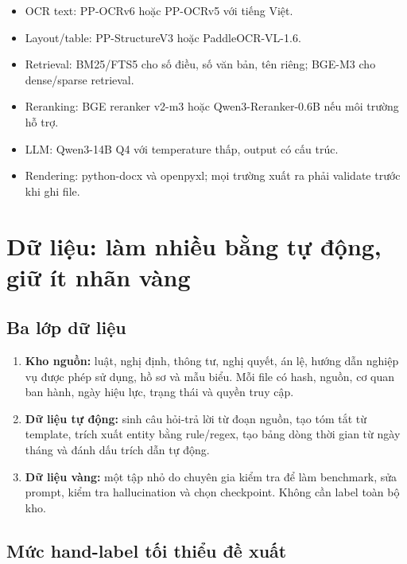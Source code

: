 \documentclass[11pt,a4paper]{article}
\begin{document}
\begin{itemize}
  \item OCR text: PP-OCRv6 hoặc PP-OCRv5 với tiếng Việt.
  \item Layout/table: PP-StructureV3 hoặc PaddleOCR-VL-1.6.
  \item Retrieval: BM25/FTS5 cho số điều, số văn bản, tên riêng; BGE-M3 cho dense/sparse retrieval.
  \item Reranking: BGE reranker v2-m3 hoặc Qwen3-Reranker-0.6B nếu môi trường hỗ trợ.
  \item LLM: Qwen3-14B Q4 với temperature thấp, output có cấu trúc.
  \item Rendering: python-docx và openpyxl; mọi trường xuất ra phải validate trước khi ghi file.
\end{itemize}

\section{Dữ liệu: làm nhiều bằng tự động, giữ ít nhãn vàng}

\subsection{Ba lớp dữ liệu}

\begin{enumerate}
  \item \textbf{Kho nguồn:} luật, nghị định, thông tư, nghị quyết, án lệ, hướng dẫn nghiệp vụ được phép sử dụng, hồ sơ và mẫu biểu. Mỗi file có hash, nguồn, cơ quan ban hành, ngày hiệu lực, trạng thái và quyền truy cập.
  \item \textbf{Dữ liệu tự động:} sinh câu hỏi-trả lời từ đoạn nguồn, tạo tóm tắt từ template, trích xuất entity bằng rule/regex, tạo bảng dòng thời gian từ ngày tháng và đánh dấu trích dẫn tự động.
  \item \textbf{Dữ liệu vàng:} một tập nhỏ do chuyên gia kiểm tra để làm benchmark, sửa prompt, kiểm tra hallucination và chọn checkpoint. Không cần label toàn bộ kho.
\end{enumerate}

\subsection{Mức hand-label tối thiểu đề xuất}
\end{document}

